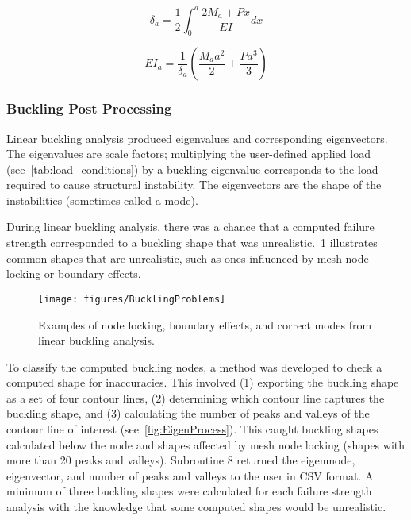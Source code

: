 \begin{equation}
	\label{eq:castigliano_3}
	\delta_{a} = \frac{1}{2} \int_{0}^{a} \frac{2M_{a}+Px}{EI} dx
\end{equation}

\begin{equation}
	\label{eq:castigliano_4}
	EI_{a} = \frac{1}{\delta_{a}}(\frac{M_{a} a^{2}}{2} + \frac{Pa^{3}}{3})
\end{equation}

\subsubsection{Buckling Post Processing}
\label{sssec:buckling_post_processing}
Linear buckling analysis produced eigenvalues and corresponding eigenvectors. The eigenvalues are scale factors; multiplying the user-defined applied load (see~\cref{tab:load_conditions}) by a buckling eigenvalue corresponds to the load required to cause structural instability. The eigenvectors are the shape of the instabilities (sometimes called a mode).

During linear buckling analysis, there was a chance that a computed failure strength corresponded to a buckling shape that was unrealistic.~\cref{fig:BucklingProblems} illustrates common shapes that are unrealistic, such as ones influenced by mesh node locking or boundary effects.

\begin{figure}[htbp]
	\centering
	\texttt{[image: figures/BucklingProblems]}
	\caption[Examples of node locking, boundary effects, and correct modes from linear buckling analysis.]{Examples of node locking, boundary effects, and correct modes from linear buckling analysis.}
	\label{fig:BucklingProblems}
\end{figure}

To classify the computed buckling nodes, a method was developed to check a computed shape for inaccuracies. This involved (1) exporting the buckling shape as a set of four contour lines, (2) determining which contour line captures the buckling shape, and (3) calculating the number of peaks and valleys of the contour line of interest (see~\cref{fig:EigenProcess}). This caught buckling shapes calculated below the node and shapes affected by mesh node locking (shapes with more than 20 peaks and valleys). Subroutine 8 returned the eigenmode, eigenvector, and number of peaks and valleys to the user in CSV format. A minimum of three buckling shapes were calculated for each failure strength analysis with the knowledge that some computed shapes would be unrealistic.

